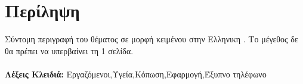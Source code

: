 \documentclass[../main.tex]{subfiles}
\begin{document}
\section*{Περίληψη}  

Σύντομη περιγραφή του θέματος σε μορφή κειμένου στην Ελληνικη . Το μέγεθος δε θα πρέπει να υπερβαίνει τη 1 σελίδα.\\

\hrulefill
\\
\textbf{Λέξεις Κλειδιά:} Εργαζόμενοι,Υγεία,Κόπωση,Εφαρμογή,Έξυπνο τηλέφωνο
\clearpage
\end{document}
